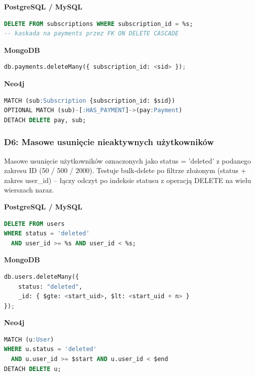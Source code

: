 \textbf{PostgreSQL / MySQL}
\begin{lstlisting}[language=SQL]
DELETE FROM subscriptions WHERE subscription_id = %s;
-- kaskada na payments przez FK ON DELETE CASCADE
\end{lstlisting}

\textbf{MongoDB}
\begin{lstlisting}[language=Python]
db.payments.deleteMany({ subscription_id: <sid> });
\end{lstlisting}

\textbf{Neo4j}
\begin{lstlisting}[language=SQL]
MATCH (sub:Subscription {subscription_id: $sid})
OPTIONAL MATCH (sub)-[:HAS_PAYMENT]->(pay:Payment)
DETACH DELETE pay, sub;
\end{lstlisting}


\subsubsection{D6: Masowe usunięcie nieaktywnych użytkowników}

Masowe usunięcie użytkowników oznaczonych jako status = 'deleted' z podanego
zakresu ID (50 / 500 / 2000). Testuje bulk-delete po filtrze złożonym
(status + zakres user\_id) -- łączy odczyt po indeksie statusu z operacją
DELETE na wielu wierszach naraz.

\textbf{PostgreSQL / MySQL}
\begin{lstlisting}[language=SQL]
DELETE FROM users
WHERE status = 'deleted'
  AND user_id >= %s AND user_id < %s;
\end{lstlisting}

\textbf{MongoDB}
\begin{lstlisting}[language=Python]
db.users.deleteMany({
    status: "deleted",
    _id: { $gte: <start_uid>, $lt: <start_uid + n> }
});
\end{lstlisting}

\textbf{Neo4j}
\begin{lstlisting}[language=SQL]
MATCH (u:User)
WHERE u.status = 'deleted'
  AND u.user_id >= $start AND u.user_id < $end
DETACH DELETE u;
\end{lstlisting}